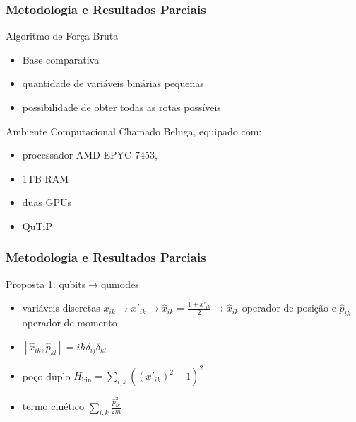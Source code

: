 \documentclass[xcolor={dvipsnames,table}]{beamer}
\begin{document}
\begin{frame}
    \frametitle{Metodologia e Resultados Parciais}
    \begin{block}{Algoritmo de Força Bruta}
        \begin{itemize}
            \item Base comparativa
            \item quantidade de variáveis binárias pequenas
            \item possibilidade de obter todas as rotas possíveis
        \end{itemize}
    \end{block}
    \pause 
    \begin{block}{Ambiente Computacional}
        Chamado Beluga, equipado com:
        \begin{itemize}
            \item processador AMD EPYC 7453,
            \item 1TB RAM 
            \item duas GPUs
            \item QuTiP
        \end{itemize}
    \end{block}
    

\end{frame}

\begin{frame}
    \frametitle{Metodologia e Resultados Parciais}

    \begin{block}{Proposta 1: qubits$\rightarrow$qumodes}
        \begin{itemize}
            \item variáveis discretas $x_{ik}\rightarrow x'_{ik}\rightarrow \hat{x}_{ik}=\displaystyle\frac{1+x'_{ik}}{2} \rightarrow\hat{x}_{ik}$ operador de posição e $\hat{p}_{ik}$ operador de momento 
            \item $[\hat{x}_{ik},{\hat{p}_{kl}}]=i\hbar\delta_{ij}\delta_{kl}$
            \item poço duplo $H_{\text{bin}}=\displaystyle\sum_{i,k}\left(\left(x'_{ik}\right)^2-1\right)^2$
            \item termo cinético $\displaystyle\sum_{i,k}\frac{\hat{p}^2_{ik}}{2m}$
        \end{itemize}
    \end{block}

\end{frame}
\end{document}
